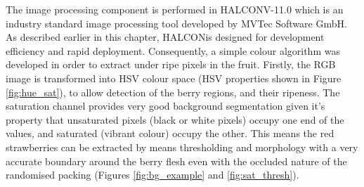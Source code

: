 \documentclass[fleqn,twoside,12pt]{report}
\begin{document}
The image processing component is performed in  HALCON\texttrademark V-11.0 which is an industry standard image processing tool developed by MVTec Software GmbH\texttrademark. As described earlier in this chapter, HALCON\texttrademark is designed for development efficiency and rapid deployment. Consequently, a simple colour algorithm was developed in order to extract under ripe pixels in the fruit. Firstly, the RGB image is transformed into HSV colour space (HSV properties shown in Figure \ref{fig:hue_sat}), to allow detection of the berry regions, and their ripeness. The saturation channel provides very good background segmentation given it's property that unsaturated pixels (black or white pixels) occupy one end of the values, and saturated (vibrant colour) occupy the other. This means the red strawberries can be extracted by means thresholding and morphology with a very accurate boundary around the berry flesh even with the occluded nature of the randomised packing (Figures \ref{fig:bg_example} and \ref{fig:sat_thresh}).
\end{document}
